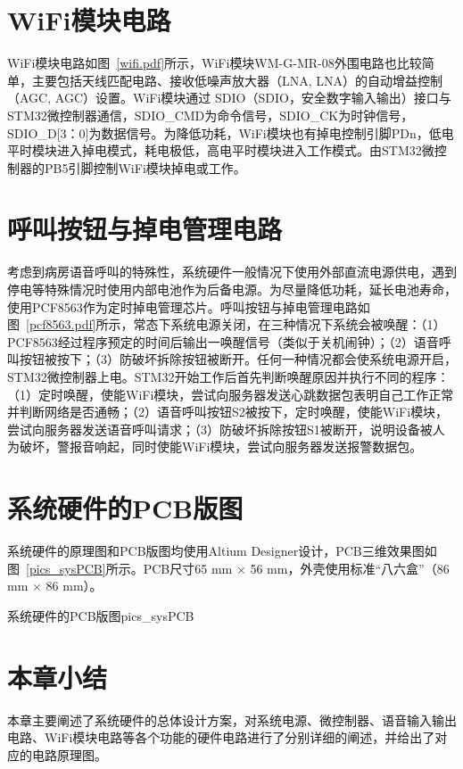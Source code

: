 \section{\acrshort{WiFi}模块电路}
\acrshort{WiFi}模块电路如图~\ref{wifi.pdf}所示，\acrshort{WiFi}模块WM-G-MR-08外围电路也比较简单，主要包括天线匹配电路、接收低噪声放大器（\acrlong{LNA}, \acrshort{LNA}）的自动增益控制（\acrlong{AGC}, \acrshort{AGC}）设置。\acrshort{WiFi}模块通过
\acrshort{SDIO}（\acrlong{SDIO}，安全数字输入输出）接口与STM32微控制器通信，SDIO{\_}CMD为命令信号，SDIO{\_}CK为时钟信号，SDIO{\_}D[3：0]为数据信号。为降低功耗，\acrshort{WiFi}模块也有掉电控制引脚PDn，低电平时模块进入掉电模式，耗电极低，高电平时模块进入工作模式。由STM32微控制器的PB5引脚控制\acrshort{WiFi}模块掉电或工作。

\section{呼叫按钮与掉电管理电路}\label{sec:butn_pdwn}
考虑到病房语音呼叫的特殊性，系统硬件一般情况下使用外部直流电源供电，遇到停电等特殊情况时使用内部电池作为后备电源。为尽量降低功耗，延长电池寿命，使用PCF8563作为定时掉电管理芯片。呼叫按钮与掉电管理电路如图~\ref{pcf8563.pdf}所示，常态下系统电源关闭，在三种情况下系统会被唤醒：（1）PCF8563经过程序预定的时间后输出一唤醒信号（类似于关机闹钟）；（2）语音呼叫按钮被按下；（3）防破坏拆除按钮被断开。任何一种情况都会使系统电源开启，STM32微控制器上电。STM32开始工作后首先判断唤醒原因并执行不同的程序：（1）定时唤醒，使能\acrshort{WiFi}模块，尝试向服务器发送心跳数据包表明自己工作正常并判断网络是否通畅；（2）语音呼叫按钮S2被按下，定时唤醒，使能\acrshort{WiFi}模块，尝试向服务器发送语音呼叫请求；（3）防破坏拆除按钮S1被断开，说明设备被人为破坏，警报音响起，同时使能\acrshort{WiFi}模块，尝试向服务器发送报警数据包。

\section{系统硬件的PCB版图}
系统硬件的原理图和PCB版图均使用Altium Designer设计，PCB三维效果图如图~\ref{pics_sysPCB}所示。PCB尺寸65 mm $\times$ 56 mm，外壳使用标准“八六盒”（86 mm $\times$ 86 mm）。
\begin{pics}[htbp]{系统硬件的PCB版图}{pics_sysPCB}
\end{pics}

\section{本章小结}
本章主要阐述了系统硬件的总体设计方案，对系统电源、微控制器、语音输入输出电路、\acrshort{WiFi}模块电路等各个功能的硬件电路进行了分别详细的阐述，并给出了对应的电路原理图。
